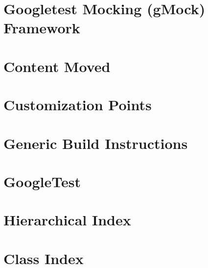 \let\mypdfximage\pdfximage\def\pdfximage{\immediate\mypdfximage}\documentclass[twoside]{book}
\newcommand{\+}{\discretionary{\mbox{\scriptsize$\hookleftarrow$}}{}{}}
\begin{document}
\chapter{Googletest Mocking (g\+Mock) Framework}
\label{md_googletest_googlemock_README}

\chapter{Content Moved}
\label{md_googletest_googletest_docs_README}

\chapter{Customization Points}
\label{md_googletest_googletest_include_gtest_internal_custom_README}

\chapter{Generic Build Instructions}
\label{md_googletest_googletest_README}

\chapter{Google\+Test}
\label{md_googletest_README}

\chapter{Hierarchical Index}

\chapter{Class Index}

\end{document}
